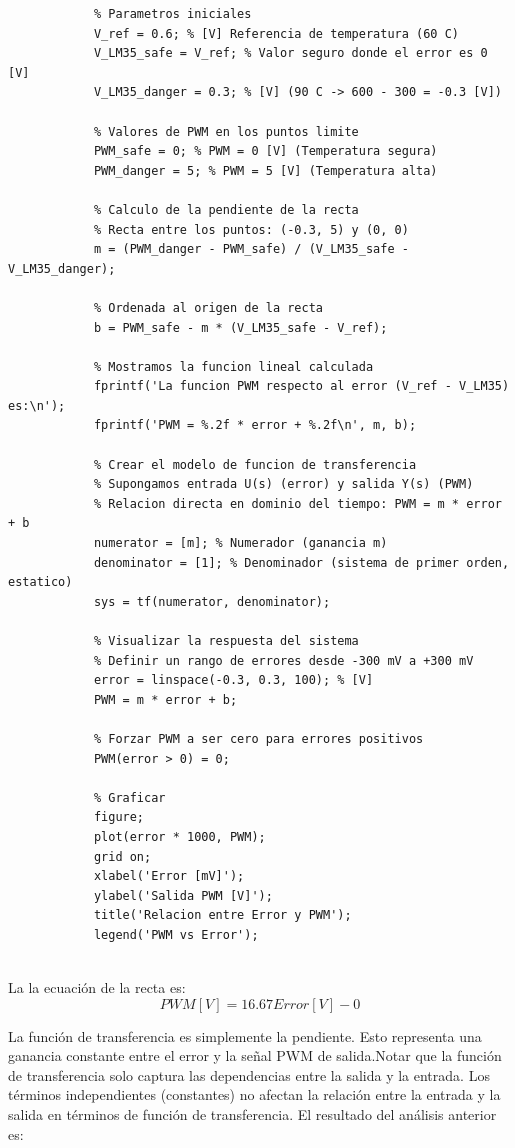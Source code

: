 \documentclass[12pt]{article}
\begin{document}
		\begin{lstlisting}
			% Parametros iniciales
			V_ref = 0.6; % [V] Referencia de temperatura (60 C)
			V_LM35_safe = V_ref; % Valor seguro donde el error es 0 [V]
			V_LM35_danger = 0.3; % [V] (90 C -> 600 - 300 = -0.3 [V])
			
			% Valores de PWM en los puntos limite
			PWM_safe = 0; % PWM = 0 [V] (Temperatura segura)
			PWM_danger = 5; % PWM = 5 [V] (Temperatura alta)
			
			% Calculo de la pendiente de la recta
			% Recta entre los puntos: (-0.3, 5) y (0, 0)
			m = (PWM_danger - PWM_safe) / (V_LM35_safe - V_LM35_danger);
			
			% Ordenada al origen de la recta
			b = PWM_safe - m * (V_LM35_safe - V_ref);
			
			% Mostramos la funcion lineal calculada
			fprintf('La funcion PWM respecto al error (V_ref - V_LM35) es:\n');
			fprintf('PWM = %.2f * error + %.2f\n', m, b);
			
			% Crear el modelo de funcion de transferencia
			% Supongamos entrada U(s) (error) y salida Y(s) (PWM)
			% Relacion directa en dominio del tiempo: PWM = m * error + b
			numerator = [m]; % Numerador (ganancia m)
			denominator = [1]; % Denominador (sistema de primer orden, estatico)
			sys = tf(numerator, denominator);
			
			% Visualizar la respuesta del sistema
			% Definir un rango de errores desde -300 mV a +300 mV
			error = linspace(-0.3, 0.3, 100); % [V]
			PWM = m * error + b;
			
			% Forzar PWM a ser cero para errores positivos
			PWM(error > 0) = 0;
			
			% Graficar
			figure;
			plot(error * 1000, PWM);
			grid on;
			xlabel('Error [mV]');
			ylabel('Salida PWM [V]');
			title('Relacion entre Error y PWM');
			legend('PWM vs Error');
			
		\end{lstlisting}
		La la ecuación de la recta es:
		\begin{equation}
			PWM[V]=16.67Error[V]-0
		\end{equation}
		
		La función de transferencia es simplemente la pendiente. Esto representa una ganancia constante entre el error y la señal PWM de salida.Notar que la función de transferencia solo captura las dependencias entre la salida y la entrada. Los términos independientes (constantes) no afectan la relación entre la entrada y la salida en términos de función de transferencia.
		El resultado del análisis anterior es:
		
\end{document}
